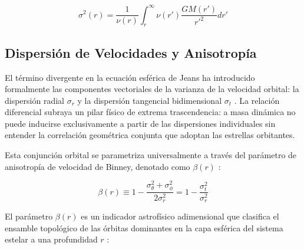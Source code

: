                     \begin{equation}
                        \sigma^2(r) = \frac{1}{\nu(r)} \int_r^\infty \nu(r') 
                        \frac{GM(r')}{r'^2} dr'
                        \label{eq:jeans_integral}
                    \end{equation}
       
            \subsection{Dispersión de Velocidades y Anisotropía}
                El término divergente en la ecuación esférica de Jeans ha 
                introducido formalmente las componentes vectoriales de la 
                varianza de la velocidad orbital: la dispersión radial 
                $\sigma_r$ y la dispersión tangencial bidimensional $\sigma_t$ 
                \cite{wolf_etal_2010}. La relación diferencial subraya un pilar 
                físico de extrema trascendencia: a masa dinámica no puede 
                inducirse exclusivamente a partir de las dispersiones 
                individuales sin entender la correlación geométrica conjunta que 
                adoptan las estrellas orbitantes.

                Esta conjunción orbital se parametriza universalmente a través 
                del parámetro de anisotropía de velocidad de Binney, denotado 
                como $\beta(r)$ \cite{binney_tremaine_2008}:

                $$\beta(r) \equiv 1 - \frac{\sigma_\theta^2 + \sigma_\phi^2}{2
                \sigma_r^2} = 1 - \frac{\sigma_t^2}{\sigma_r^2}$$

                El parámetro $\beta(r)$ es un indicador astrofísico adimensional 
                que clasifica el ensamble topológico de las órbitas dominantes 
                en la capa esférica del sistema estelar a una profundidad $r$ 
                \cite{binney_tremaine_2008}:

